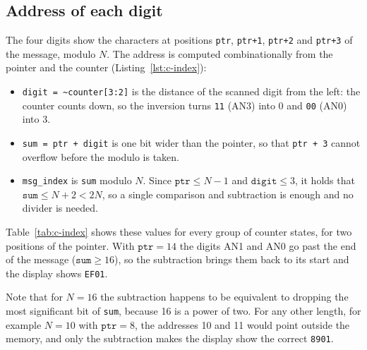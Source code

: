 \documentclass{article}
\begin{document}
\subsection{Address of each digit}
The four digits show the characters at positions \texttt{ptr}, \texttt{ptr+1},
\texttt{ptr+2} and \texttt{ptr+3} of the message, modulo $N$. The address is
computed combinationally from the pointer and the counter (Listing~\ref{lst:c-index}):
\begin{itemize}
  \item \texttt{digit = \textasciitilde counter[3:2]} is the distance of the
        scanned digit from the left: the counter counts down, so the inversion
        turns \texttt{11} (AN3) into 0 and \texttt{00} (AN0) into 3.
  \item \texttt{sum = ptr + digit} is one bit wider than the pointer, so that
        \texttt{ptr + 3} cannot overflow before the modulo is taken.
  \item \texttt{msg\_index} is \texttt{sum} modulo $N$. Since
        $\texttt{ptr} \le N-1$ and $\texttt{digit} \le 3$, it holds that
        $\texttt{sum} \le N+2 < 2N$, so a single comparison and subtraction is
        enough and no divider is needed.
\end{itemize}



Table~\ref{tab:c-index} shows these values for every group of counter states, for
two positions of the pointer. With $\texttt{ptr} = 14$ the digits AN1 and AN0 go
past the end of the message ($\texttt{sum} \ge 16$), so the subtraction brings
them back to its start and the display shows \texttt{EF01}.

Note that for $N = 16$ the subtraction happens to be equivalent to dropping the
most significant bit of \texttt{sum}, because 16 is a power of two. For any other
length, for example $N = 10$ with $\texttt{ptr} = 8$, the addresses 10 and 11
would point outside the memory, and only the subtraction makes the display show
the correct \texttt{8901}.
\end{document}
